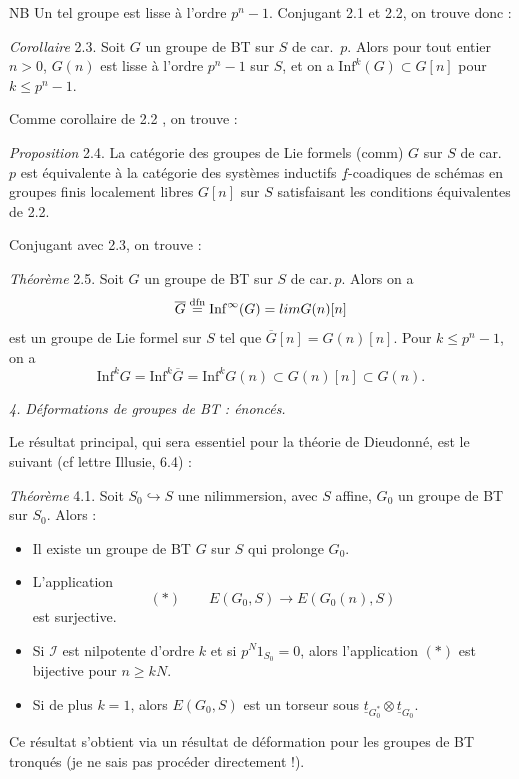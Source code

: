 \documentclass[11pt,a4paper]{article}
\begin{document}
NB Un tel groupe est lisse à l'ordre $p^n - 1$. Conjugant 2.1 et 2.2, on trouve donc :

\emph{Corollaire} 2.3. Soit $G$ un groupe de BT sur $S$ de car.\ $p$. Alors pour tout entier $n > 0$, $G(n)$ est lisse à l'ordre $p^n - 1$ sur $S$, et on a $\mathrm{Inf}^k(G) \subset G[n]$ pour $k \leq p^n - 1$.

 Comme corollaire de 2.2 , on trouve :

\emph{Proposition} 2.4. La catégorie des groupes de Lie formels (comm) $G$ sur $S$ de car.\ $p$ est équivalente à la catégorie des systèmes inductifs $\underline{f}$-coadiques de schémas en groupes finis localement libres $G[n]$ sur $S$ satisfaisant les conditions équivalentes de 2.2.

Conjugant avec 2.3, on trouve :

\emph{Théorème} 2.5. Soit $G$ un groupe de BT sur $S$ de car.\,$p$. Alors on a
\[
\overline{G} \overset{\mathrm{dfn}}{=} \mathrm{Inf}^{\infty}(G) = \varinjlim G(n)[n]
\]
est un groupe de Lie formel sur $S$ tel que $\overline{G}[n] = G(n)[n]$. Pour $k \leq p^n - 1$, on a
\[
\mathrm{Inf}^k G = \mathrm{Inf}^k \overline{G} = \mathrm{Inf}^k G(n) \subset G(n)[n] \subset G(n) .
\]

\emph{4.}  \emph{Déformations de groupes de BT : énoncés.}

Le résultat principal, qui sera essentiel pour la théorie de Dieudonné, est le suivant (cf lettre Illusie, 6.4) :

\emph{Théorème} 4.1. Soit $S_0 \hookrightarrow S$ une nilimmersion, avec $S$ affine, $G_0$ un groupe de BT sur $S_0$. Alors :
\begin{itemize}
  \item[a)] Il existe un groupe de BT $G$ sur $S$ qui prolonge $G_0$.
  \item[b)] L'application
  \[
  (*) \qquad E(G_0, S) \longrightarrow E(G_0(n), S)
  \]
  est surjective.
  \item[c)] Si $\mathcal{I}$ est nilpotente d'ordre $k$ et si $p^N 1_{S_0} = 0$, alors l'application $(*)$ est bijective pour $n \geq kN$.
  \item[d)] Si de plus $k = 1$, alors $E(G_0, S)$ est un torseur sous $\underline{t}_{G_0^{*}} \otimes \underline{t}_{G_0}$.
\end{itemize}
Ce résultat s'obtient via un résultat de déformation pour les groupes de BT tronqués (je ne sais pas procéder directement !).
\end{document}
